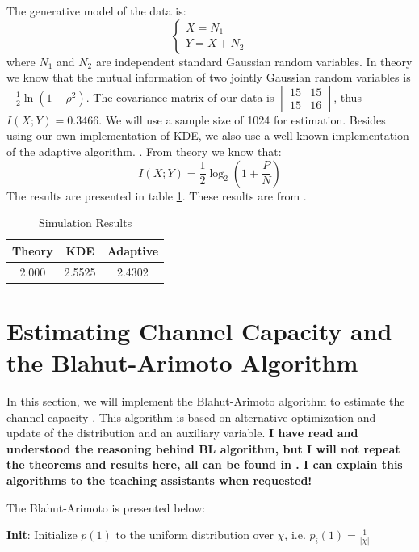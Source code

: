 \documentclass{article}
\begin{document}
	The generative model of the data is:
	\begin{equation*}
	\begin{cases}
	X = N_1\\
	Y = X + N_2
	\end{cases}
	\end{equation*}
	where $N_1$ and $N_2$ are independent standard Gaussian random variables. In theory we know that the mutual information of two jointly Gaussian random variables is $-\frac{1}{2} \ln (1-\rho^2)$. The covariance matrix of our data is $\begin{bmatrix}
	15 & 15\\
	15 & 16
	\end{bmatrix}$, thus $I(X; Y) = 0.3466$. We will use a sample size of 1024 for estimation. Besides using our own implementation of KDE, we also use a well known implementation of the adaptive algorithm. . From theory we know that:
	$$I(X; Y) = \frac{1}{2} \log_2 (1 + \frac{P}{N})$$
	The results are presented in table \ref{resfig}. These results are from \cite{wang2009universal}.
	\begin{table}[h!]
		\centering
		\begin{tabular}{|c|c|c|}
			\hline
			Theory & KDE    & Adaptive \\ \hline
			2.000 & 2.5525 & 2.4302   \\ \hline
		\end{tabular}
	\caption{Simulation Results}
	\label{resfig}
	\end{table}
	
	
	\section{Estimating Channel Capacity and the Blahut-Arimoto Algorithm}
	
	In this section, we will implement the Blahut-Arimoto algorithm to estimate the channel capacity \cite{yeung2008blahut}. This algorithm is based on alternative optimization and update of the distribution and  an auxiliary variable. \textbf{I have read and understood the reasoning behind BL algorithm, but I will not repeat the theorems and results here, all can be found in \cite{yeung2008blahut}. I can explain this algorithms to the teaching assistants when requested!}
	
	
	
	The Blahut-Arimoto is presented below:
	
	\textbf{Init}: Initialize $p(1)$ to the uniform distribution over $\chi$, i.e. $p_i(1)=\frac{1}{|\chi|}$
	
\end{document}
